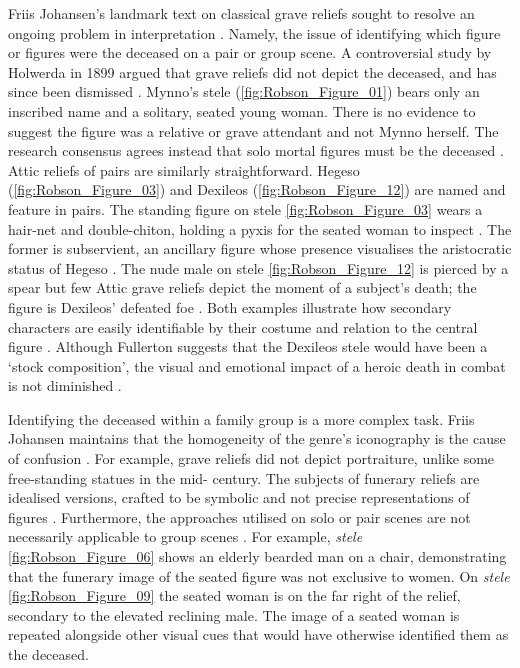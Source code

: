 Friis Johansen’s landmark text on classical grave reliefs sought to resolve an ongoing problem in interpretation \parencite[53]{Friis1951}.
Namely, the issue of identifying which figure or figures were the deceased on a pair or group scene. A controversial study by Holwerda in 1899 argued that grave reliefs did not depict the deceased, and has since been dismissed \parencite{Holwerda1899}.
Mynno’s stele (\ref{fig:Robson_Figure_01}) bears only an inscribed name and a solitary, seated young woman.
There is no evidence to suggest the figure was a relative or grave attendant and not Mynno herself. The research consensus agrees instead that solo mortal figures must be the deceased \parencite[119]{Stears1995}.
Attic reliefs of pairs are similarly straightforward. Hegeso (\ref{fig:Robson_Figure_03}) and Dexileos (\ref{fig:Robson_Figure_12}) are named and feature in pairs.
The standing figure on stele \ref{fig:Robson_Figure_03} wears a hair-net and double-chiton, holding a pyxis for the seated woman to inspect \parencite[292]{Barker1924}.
The former is subservient, an ancillary figure whose presence visualises the aristocratic status of Hegeso \parencite[689]{Leader1997}.
The nude male on stele \ref{fig:Robson_Figure_12} is pierced by a spear but few Attic grave reliefs depict the moment of a subject’s death; the figure is Dexileos' defeated foe \parencite[57]{Hurwit2007}.
Both examples illustrate how secondary characters are easily identifiable by their costume and relation to the central figure \parencite[53]{Friis1951}.
Although Fullerton suggests that the Dexileos stele would have been a \enquote*{stock composition}, the visual and emotional impact of a heroic death in combat is not diminished \parencite[549]{Fullerton2016}.

Identifying the deceased within a family group is a more complex task. Friis Johansen maintains that the homogeneity of the genre’s iconography is the cause of confusion \parencite[55]{Friis1951}.
For example, grave reliefs did not depict portraiture, unlike some free-standing statues in the mid- century. The subjects of funerary reliefs are idealised versions, crafted to be symbolic and not precise representations of figures \parencite[313]{Grossman2007}.
Furthermore, the approaches utilised on solo or pair scenes are not necessarily applicable to group scenes \parencite[62]{Vonrodenwaldt1923}.
For example, \textit{stele} \ref{fig:Robson_Figure_06} shows an elderly bearded man on a chair, demonstrating that the funerary image of the seated figure was not exclusive to women. On \textit{stele} \ref{fig:Robson_Figure_09} the seated woman is on the far right of the relief, secondary to the elevated reclining male. The image of a seated woman is repeated alongside other visual cues that would have otherwise identified them as the deceased.

